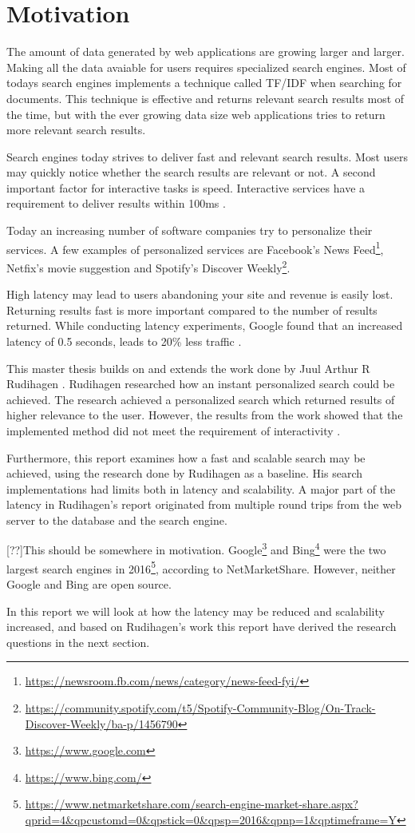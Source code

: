 \section{Motivation}
The amount of data generated by web applications are growing larger and larger.
Making all the data avaiable for users requires specialized search engines.
Most of todays search engines implements a technique called TF/IDF when searching for documents.
This technique is effective and returns relevant search results most of the time,
but with the ever growing data size web applications tries to return more relevant search results.




Search engines today strives to deliver fast and relevant search results.
Most users may quickly notice whether the search results are relevant or not.
A second important factor for interactive tasks is speed.
Interactive services have a requirement to deliver results within 100ms \cite{google-latency}.

Today an increasing number of software companies try to personalize their services.
A few examples of personalized services are Facebook's News Feed\footnote{\url{https://newsroom.fb.com/news/category/news-feed-fyi/}},
Netfix's movie suggestion \cite{netflix-recommendation} and Spotify's Discover Weekly\footnote{\url{https://community.spotify.com/t5/Spotify-Community-Blog/On-Track-Discover-Weekly/ba-p/1456790}}.

High latency may lead to users abandoning your site and revenue is easily lost.
Returning results fast is more important compared to the number of results returned.
While conducting latency experiments, Google found that an increased latency of 0.5 seconds, leads to 20\% less traffic \cite{google-marissa}.

This master thesis builds on and extends the work done by Juul Arthur R Rudihagen \cite{master-thesis}.
Rudihagen researched how an instant personalized search could be achieved.
The research achieved a personalized search which returned results of higher relevance to the user.
However, the results from the work showed that the implemented method did not meet the requirement of interactivity \cite{master-thesis}.

Furthermore, this report examines how a fast and scalable search may be achieved, using the research done by Rudihagen as a baseline.
His search implementations had limits both in latency and scalability.
A major part of the latency in Rudihagen's report originated from multiple round trips from the web server to the database and the search engine.

[??]This should be somewhere in motivation.
Google\footnote{\url{https://www.google.com}} and Bing\footnote{\url{https://www.bing.com/}}
were the two largest search engines in 2016\footnote{\url{https://www.netmarketshare.com/search-engine-market-share.aspx?qprid=4&qpcustomd=0&qpstick=0&qpsp=2016&qpnp=1&qptimeframe=Y}},
according to NetMarketShare.
However, neither Google and Bing are open source.

In this report we will look at how the latency may be reduced and scalability increased,
and based on Rudihagen's work this report have derived the research questions in the next section.
